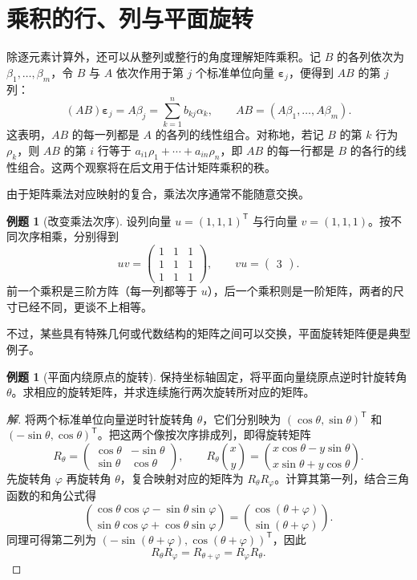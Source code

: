 \documentclass[UTF8,fontset=fandol,a4paper,12pt]{ctexart}
\newcommand{\trans}{\mathsf T}
\newcommand{\ve}{\boldsymbol{\varepsilon}}
\theoremstyle{definition}
\newtheorem{example}[definition]{例题}
\begin{document}
\section{乘积的行、列与平面旋转}

除逐元素计算外，还可以从整列或整行的角度理解矩阵乘积。记 $B$ 的各列依次为 $\beta_1,\ldots,\beta_m$，令 $B$ 与 $A$ 依次作用于第 $j$ 个标准单位向量 $\ve_j$，便得到 $AB$ 的第 $j$ 列：
\[
 (AB)\ve_j=A\beta_j=\sum_{k=1}^{n}b_{kj}\alpha_k,\qquad
 AB=(A\beta_1,\ldots,A\beta_m).
\]
这表明，$AB$ 的每一列都是 $A$ 的各列的线性组合。对称地，若记 $B$ 的第 $k$ 行为 $\rho_k$，则 $AB$ 的第 $i$ 行等于 $a_{i1}\rho_1+\cdots+a_{in}\rho_n$，即 $AB$ 的每一行都是 $B$ 的各行的线性组合。这两个观察将在后文用于估计矩阵乘积的秩。

由于矩阵乘法对应映射的复合，乘法次序通常不能随意交换。

\begin{example}[改变乘法次序]
设列向量 $u=(1,1,1)^{\trans}$ 与行向量 $v=(1,1,1)$。按不同次序相乘，分别得到
\[
 uv=\begin{pmatrix}1&1&1\\1&1&1\\1&1&1\end{pmatrix},
 \qquad vu=\begin{pmatrix}3\end{pmatrix}.
\]
前一个乘积是三阶方阵（每一列都等于 $u$），后一个乘积则是一阶矩阵，两者的尺寸已经不同，更谈不上相等。
\end{example}

不过，某些具有特殊几何或代数结构的矩阵之间可以交换，平面旋转矩阵便是典型例子。

\begin{example}[平面内绕原点的旋转]
保持坐标轴固定，将平面向量绕原点逆时针旋转角 $\theta$。求相应的旋转矩阵，并求连续施行两次旋转所对应的矩阵。
\end{example}
\begin{proof}[解]
将两个标准单位向量逆时针旋转角 $\theta$，它们分别映为 $(\cos\theta,\sin\theta)^{\trans}$ 和 $(-\sin\theta,\cos\theta)^{\trans}$。把这两个像按次序排成列，即得旋转矩阵
\[
 R_\theta=\begin{pmatrix}\cos\theta&-\sin\theta\\\sin\theta&\cos\theta\end{pmatrix},
 \qquad R_\theta\binom{x}{y}
 =\binom{x\cos\theta-y\sin\theta}{x\sin\theta+y\cos\theta}.
\]
先旋转角 $\varphi$ 再旋转角 $\theta$，复合映射对应的矩阵为 $R_\theta R_\varphi$。计算其第一列，结合三角函数的和角公式得
\[
 \binom{\cos\theta\cos\varphi-\sin\theta\sin\varphi}
       {\sin\theta\cos\varphi+\cos\theta\sin\varphi}
 =\binom{\cos(\theta+\varphi)}{\sin(\theta+\varphi)}.
\]
同理可得第二列为 $(-\sin(\theta+\varphi),\cos(\theta+\varphi))^{\trans}$，因此
\[
 R_\theta R_\varphi=R_{\theta+\varphi}=R_\varphi R_\theta.
\]
\end{proof}
\end{document}
